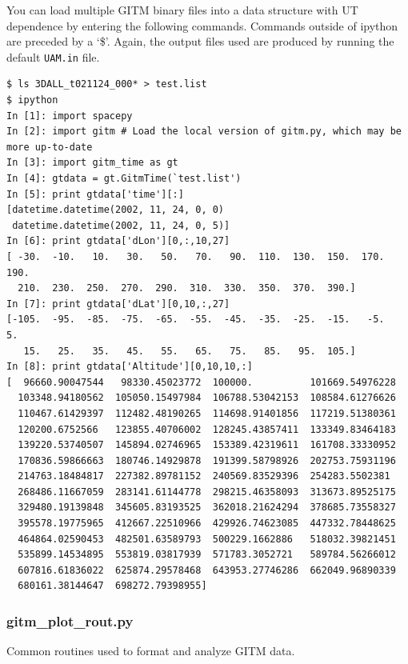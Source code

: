You can load multiple GITM binary files into a data structure with UT dependence by entering the following commands.  Commands outside of ipython are preceded by a `\$'.  Again, the output files used are produced by running the default {\tt UAM.in} file.

\begin{verbatim}
$ ls 3DALL_t021124_000* > test.list
$ ipython
In [1]: import spacepy
In [2]: import gitm # Load the local version of gitm.py, which may be more up-to-date
In [3]: import gitm_time as gt
In [4]: gtdata = gt.GitmTime(`test.list')
In [5]: print gtdata['time'][:]
[datetime.datetime(2002, 11, 24, 0, 0)
 datetime.datetime(2002, 11, 24, 0, 5)]
In [6]: print gtdata['dLon'][0,:,10,27]
[ -30.  -10.   10.   30.   50.   70.   90.  110.  130.  150.  170.  190.
  210.  230.  250.  270.  290.  310.  330.  350.  370.  390.]
In [7]: print gtdata['dLat'][0,10,:,27]
[-105.  -95.  -85.  -75.  -65.  -55.  -45.  -35.  -25.  -15.   -5.    5.
   15.   25.   35.   45.   55.   65.   75.   85.   95.  105.]
In [8]: print gtdata['Altitude'][0,10,10,:]
[  96660.90047544   98330.45023772  100000.          101669.54976228
  103348.94180562  105050.15497984  106788.53042153  108584.61276626
  110467.61429397  112482.48190265  114698.91401856  117219.51380361
  120200.6752566   123855.40706002  128245.43857411  133349.83464183
  139220.53740507  145894.02746965  153389.42319611  161708.33330952
  170836.59866663  180746.14929878  191399.58798926  202753.75931196
  214763.18484817  227382.89781152  240569.83529396  254283.5502381
  268486.11667059  283141.61144778  298215.46358093  313673.89525175
  329480.19139848  345605.83193525  362018.21624294  378685.73558327
  395578.19775965  412667.22510966  429926.74623085  447332.78448625
  464864.02590453  482501.63589793  500229.1662886   518032.39821451
  535899.14534895  553819.03817939  571783.3052721   589784.56266012
  607816.61836022  625874.29578468  643953.27746286  662049.96890339
  680161.38144647  698272.79398955]
\end{verbatim}

\subsubsection{gitm\_plot\_rout.py}

Common routines used to format and analyze GITM data.

